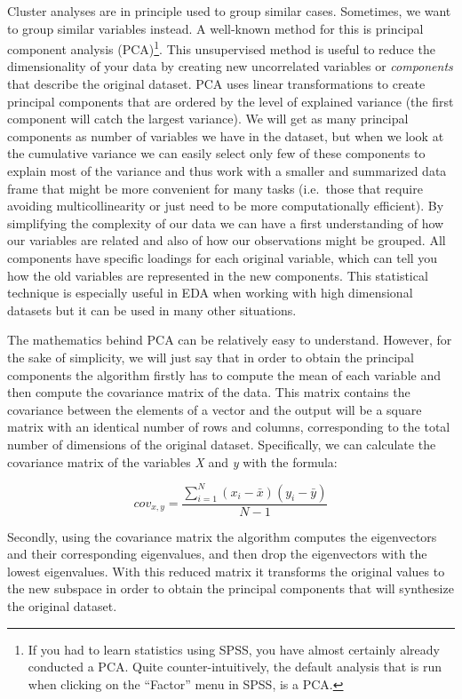 Cluster analyses are in principle used to group similar
cases. Sometimes, we want to group similar variables instead.  A
well-known method for this is principal component analysis (PCA)\footnote{If you had to learn statistics using SPSS, you have almost certainly already conducted a PCA. Quite counter-intuitively, the default analysis that is run when clicking on the ``Factor'' menu in SPSS, is a PCA.}. This
unsupervised method is useful to reduce the dimensionality of your
data by creating new uncorrelated variables or \textit{components}
that describe the original dataset. PCA uses linear transformations to
create principal components that are ordered by the level of explained
variance (the first component will catch the largest variance). We
will get as many principal components as number of variables we have
in the dataset, but when we look at the cumulative variance we can
easily select only few of these components to explain most of the
variance and thus work with a smaller and summarized data frame that
might be more convenient for many tasks (i.e.\ those that require
avoiding multicollinearity or just need to be more computationally
efficient). By simplifying the complexity of our data we can have a
first understanding of how our variables are related and also of how
our observations might be grouped. All components have specific loadings
for each original variable, which can tell you how the old variables
are represented in the new components. This statistical technique is
especially useful in EDA when working with high dimensional datasets
but it can be used in many other situations.

The mathematics behind PCA can be relatively easy to
understand. However, for the sake of simplicity, we will just say that
in order to obtain the principal components the algorithm firstly has
to compute the mean of each variable and then compute the covariance
matrix of the data. This matrix contains the covariance between the
elements of a vector and the output will be a square matrix with an 
identical number of rows and columns, corresponding to the total
number of dimensions of the original dataset. Specifically, we can
calculate the covariance matrix of the variables \emph{X} and \emph{y}
with the formula:

$$cov_{x,y}=\frac{\sum_{i=1}^{N}(x_{i}-\bar{x})(y_{i}-\bar{y})}{N-1}$$

Secondly, using the covariance matrix the algorithm computes the eigenvectors and their corresponding eigenvalues, and then drop the eigenvectors with the lowest eigenvalues. With this reduced matrix it transforms the original values to the new subspace in order to obtain the principal components that will synthesize the original dataset.

